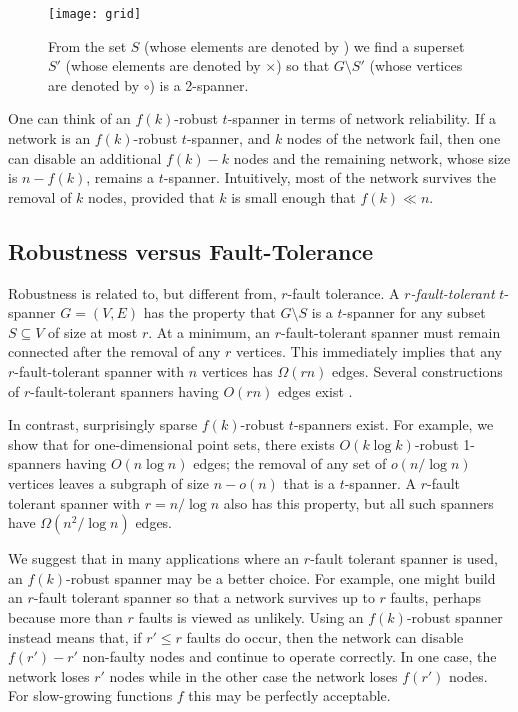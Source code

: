 \documentclass{patmorin}
\begin{document}
\begin{figure}
  \begin{center}
    \texttt{[image: grid]}
  \end{center}
  \caption{From the set $S$ (whose elements are denoted by \textbullet)
  we find a superset $S'$ (whose elements are denoted by $\times$)
  so that $G\setminus S'$ (whose vertices are denoted by $\circ$) is a 2-spanner.}
\end{figure}

One can think of an $f(k)$-robust $t$-spanner in terms of network
reliability.  If a network is an $f(k)$-robust $t$-spanner, and $k$ nodes
of the network fail, then one can disable an additional $f(k)-k$ nodes
and the remaining network, whose size is $n-f(k)$, remains a $t$-spanner.
Intuitively, most of the network survives the removal of $k$ nodes,
provided that $k$ is small enough that $f(k)\ll n$.

\subsection{Robustness versus Fault-Tolerance}

Robustness is related to, but different from, $r$-fault tolerance.
A \emph{$r$-fault-tolerant} $t$-spanner $G=(V,E)$ has the property that
$G\setminus S$ is a $t$-spanner for any subset $S\subseteq V$ of size
at most $r$. At a minimum, an $r$-fault-tolerant spanner must remain
connected after the removal of any $r$ vertices.  This immediately implies
that any $r$-fault-tolerant spanner with $n$ vertices has $\Omega(rn)$
edges.  Several constructions of $r$-fault-tolerant spanners having
$O(rn)$ edges exist \cite{cz04,lns02,l99}.

In contrast, surprisingly sparse $f(k)$-robust $t$-spanners exist.
For example, we show that for one-dimensional point sets, there exists
$O(k\log k)$-robust 1-spanners having $O(n\log n)$ edges; the removal of
any set of $o(n/\log n)$ vertices leaves a subgraph of size $n-o(n)$ that
is a $t$-spanner.  A $r$-fault tolerant spanner with $r=n/\log n$ also
has this property, but all such spanners have $\Omega(n^2/\log n)$ edges.

We suggest that in many applications where an $r$-fault tolerant spanner
is used, an $f(k)$-robust spanner may be a better choice.  For example,
one might build an $r$-fault tolerant spanner so that a network survives
up to $r$ faults, perhaps because more than $r$ faults is viewed as
unlikely.  Using an $f(k)$-robust spanner instead means that, if $r'\le
r$ faults do occur, then the network can disable $f(r')-r'$ non-faulty
nodes and continue to operate correctly.  In one case, the network loses
$r'$ nodes while in the other case the network loses $f(r')$ nodes.
For slow-growing functions $f$ this may be perfectly acceptable.
\end{document}
